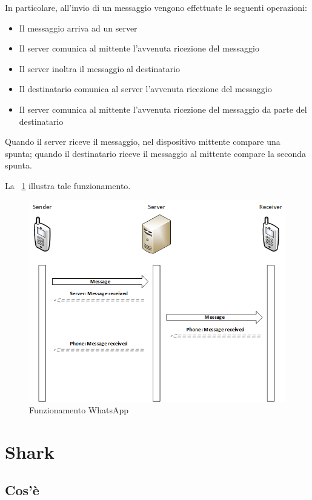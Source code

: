 \documentclass[a4paper,11pt]{book}
\begin{document}
In particolare, all'invio di un messaggio vengono effettuate le seguenti operazioni:
\begin{itemize}
 \item Il messaggio arriva ad un server
 \item Il server comunica al mittente l'avvenuta ricezione del messaggio
 \item Il server inoltra il messaggio al destinatario
 \item Il destinatario comunica al server l'avvenuta ricezione del messaggio
 \item Il server comunica al mittente l'avvenuta ricezione del messaggio da parte del destinatario
\end{itemize}

Quando il server riceve il messaggio, nel dispositivo mittente compare una spunta; quando il destinatario riceve il messaggio al mittente compare la seconda spunta.

La \figurename ~\ref{fig:WhatsApp} illustra tale funzionamento.
~
\begin{figure}[h!t]
\centering
\includegraphics[scale = 0.6]{rete}
\caption{Funzionamento WhatsApp}
\label{fig:WhatsApp}
\end{figure}

\clearpage

\section{Shark}
\subsection{Cos'\`e}
\end{document}
